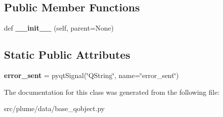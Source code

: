 \subsection*{Public Member Functions}
\begin{DoxyCompactItemize}
\item 
def {\bfseries \+\_\+\+\_\+init\+\_\+\+\_\+} (self, parent=None)\hypertarget{classplume-creator_1_1src_1_1plume_1_1data_1_1base__qobject_1_1_base_q_object_ac9c657fd9d98c5c815b178675649df5d}{}\label{classplume-creator_1_1src_1_1plume_1_1data_1_1base__qobject_1_1_base_q_object_ac9c657fd9d98c5c815b178675649df5d}

\end{DoxyCompactItemize}
\subsection*{Static Public Attributes}
\begin{DoxyCompactItemize}
\item 
{\bfseries error\+\_\+sent} = pyqt\+Signal(\char`\"{}Q\+String\char`\"{}, name=\char`\"{}error\+\_\+sent\char`\"{})\hypertarget{classplume-creator_1_1src_1_1plume_1_1data_1_1base__qobject_1_1_base_q_object_a8f84b957ee236c0440455413201b6be4}{}\label{classplume-creator_1_1src_1_1plume_1_1data_1_1base__qobject_1_1_base_q_object_a8f84b957ee236c0440455413201b6be4}

\end{DoxyCompactItemize}


The documentation for this class was generated from the following file\+:\begin{DoxyCompactItemize}
\item 
src/plume/data/base\+\_\+qobject.\+py\end{DoxyCompactItemize}
